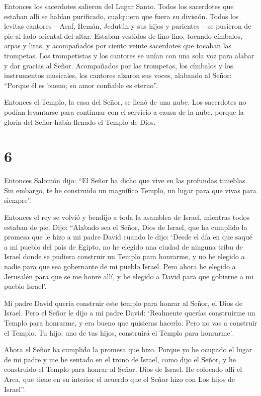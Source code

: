  Entonces los sacerdotes salieron del Lugar Santo. Todos
los sacerdotes que estaban allí se habían purificado, cualquiera que
fuera su división.  Todos los levitas cantores -- Asaf,
Hemán, Jedutún y sus hijos y parientes -- se pusieron de pie al lado
oriental del altar. Estaban vestidos de lino fino, tocando címbalos,
arpas y liras, y acompañados por ciento veinte sacerdotes que tocaban
las trompetas.  Los trompetistas y los cantores se unían
con una sola voz para alabar y dar gracias al Señor. Acompañados por las
trompetas, los címbalos y los instrumentos musicales, los cantores
alzaron sus voces, alabando al Señor: ``Porque él es bueno; su amor
confiable es eterno''.

Entonces el Templo, la casa del Señor, se llenó de una nube.
 Los sacerdotes no podían levantarse para continuar con el
servicio a causa de la nube, porque la gloria del Señor había llenado el
Templo de Dios.

\hypertarget{section-5}{%
\section{6}\label{section-5}}

 Entonces Salomón dijo: ``El Señor ha dicho que vive en las
profundas tinieblas.  Sin embargo, te he construido un
magnífico Templo, un lugar para que vivas para siempre''.

 Entonces el rey se volvió y bendijo a toda la asamblea de
Israel, mientras todos estaban de pie.  Dijo: ``Alabado sea
el Señor, Dios de Israel, que ha cumplido la promesa que le hizo a mi
padre David cuando le dijo:  `Desde el día en que saqué a mi
pueblo del país de Egipto, no he elegido una ciudad de ninguna tribu de
Israel donde se pudiera construir un Templo para honrarme, y no he
elegido a nadie para que sea gobernante de mi pueblo Israel.
 Pero ahora he elegido a Jerusalén para que se me honre
allí, y he elegido a David para que gobierne a mi pueblo Israel'.

 Mi padre David quería construir este templo para honrar al
Señor, el Dios de Israel.  Pero el Señor le dijo a mi padre
David: `Realmente querías construirme un Templo para honrarme, y era
bueno que quisieras hacerlo.  Pero no vas a construir el
Templo. Tu hijo, uno de tus hijos, construirá el Templo para honrarme'.

 Ahora el Señor ha cumplido la promesa que hizo. Porque yo
he ocupado el lugar de mi padre y me he sentado en el trono de Israel,
como dijo el Señor, y he construido el Templo para honrar al Señor, Dios
de Israel.  He colocado allí el Arca, que tiene en su
interior el acuerdo que el Señor hizo con Los hijos de Israel''.

